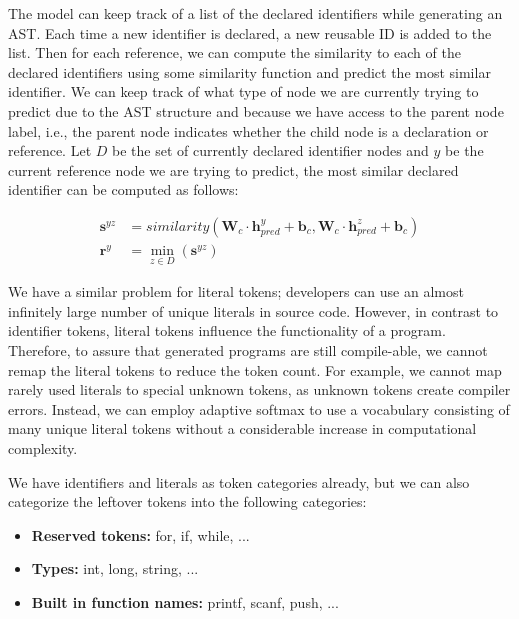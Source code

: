 The model can keep track of a list of the declared identifiers while generating an AST. Each time a new identifier is declared, a new reusable ID is added to the list. Then for each reference, we can compute the similarity to each of the declared identifiers using some similarity function and predict the most similar identifier. We can keep track of what type of node we are currently trying to predict due to the AST structure and because we have access to the parent node label, i.e., the parent node indicates whether the child node is a declaration or reference. Let $D$ be the set of currently declared identifier nodes and $y$ be the current reference node we are trying to predict, the most similar declared identifier can be computed as follows:

\begin{align}
    \mathbf{s}^{yz} &= similarity(\mathbf{W}_c \cdot \mathbf{h}^y_{pred} + \mathbf{b}_c,  \mathbf{W}_c \cdot \mathbf{h}^z_{pred} + \mathbf{b}_c) \\
    \mathbf{r}^y &= \min_{z \in D}(\mathbf{s}^{yz})
\end{align}



We have a similar problem for literal tokens; developers can use an almost infinitely large number of unique literals in source code. However, in contrast to identifier tokens, literal tokens influence the functionality of a program. Therefore, to assure that generated programs are still compile-able, we cannot remap the literal tokens to reduce the token count. For example, we cannot map rarely used literals to special unknown tokens, as unknown tokens create compiler errors. Instead, we can employ adaptive softmax \cite{grave2017efficient} to use a vocabulary consisting of many unique literal tokens without a considerable increase in computational complexity.



We have identifiers and literals as token categories already, but we can also categorize the leftover tokens into the following categories:

\begin{itemize}
    \item \textbf{Reserved tokens:} for, if, while, ...
    \item \textbf{Types:} int, long, string, ...
    \item \textbf{Built in function names:} printf, scanf, push, ...
\end{itemize}



